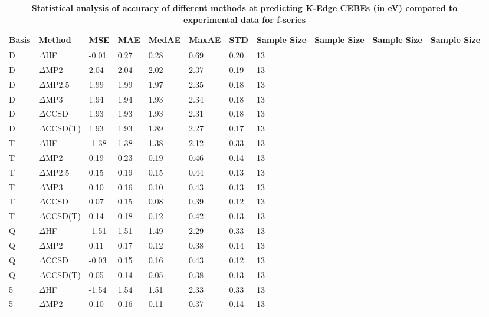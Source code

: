 \begin{table}
  \caption{\textbf{Statistical analysis of accuracy of different methods at predicting K-Edge CEBEs (in eV) compared to experimental data for f-series}}
  \label{tbl:summary-f}
  \begin{tabular}{l l l l l l l l l l l }
    \hline
    \textbf{Basis} & \textbf{Method} & \textbf{MSE} & \textbf{MAE} & \textbf{MedAE} & \textbf{MaxAE} & \textbf{STD} & \textbf{Sample Size} & \textbf{Sample Size} & \textbf{Sample Size} & \textbf{Sample Size} \\ 
    \hline
    D & $\Delta$HF & -0.01 & 0.27 & 0.28 & 0.69 & 0.20 & 13 \\ 
    D & $\Delta$MP2 & 2.04 & 2.04 & 2.02 & 2.37 & 0.19 & 13 \\ 
    D & $\Delta$MP2.5 & 1.99 & 1.99 & 1.97 & 2.35 & 0.18 & 13 \\ 
    D & $\Delta$MP3 & 1.94 & 1.94 & 1.93 & 2.34 & 0.18 & 13 \\ 
    D & $\Delta$CCSD & 1.93 & 1.93 & 1.93 & 2.31 & 0.18 & 13 \\ 
    D & $\Delta$CCSD(T) & 1.93 & 1.93 & 1.89 & 2.27 & 0.17 & 13 \\ 
    T & $\Delta$HF & -1.38 & 1.38 & 1.38 & 2.12 & 0.33 & 13 \\ 
    T & $\Delta$MP2 & 0.19 & 0.23 & 0.19 & 0.46 & 0.14 & 13 \\ 
    T & $\Delta$MP2.5 & 0.15 & 0.19 & 0.15 & 0.44 & 0.13 & 13 \\ 
    T & $\Delta$MP3 & 0.10 & 0.16 & 0.10 & 0.43 & 0.13 & 13 \\ 
    T & $\Delta$CCSD & 0.07 & 0.15 & 0.08 & 0.39 & 0.12 & 13 \\ 
    T & $\Delta$CCSD(T) & 0.14 & 0.18 & 0.12 & 0.42 & 0.13 & 13 \\ 
    Q & $\Delta$HF & -1.51 & 1.51 & 1.49 & 2.29 & 0.33 & 13 \\ 
    Q & $\Delta$MP2 & 0.11 & 0.17 & 0.12 & 0.38 & 0.14 & 13 \\ 
    Q & $\Delta$CCSD & -0.03 & 0.15 & 0.16 & 0.43 & 0.12 & 13 \\ 
    Q & $\Delta$CCSD(T) & 0.05 & 0.14 & 0.05 & 0.38 & 0.13 & 13 \\ 
    5 & $\Delta$HF & -1.54 & 1.54 & 1.51 & 2.33 & 0.33 & 13 \\ 
    5 & $\Delta$MP2 & 0.10 & 0.16 & 0.11 & 0.37 & 0.14 & 13 \\ 
    \hline
  \end{tabular}
\end{table}

